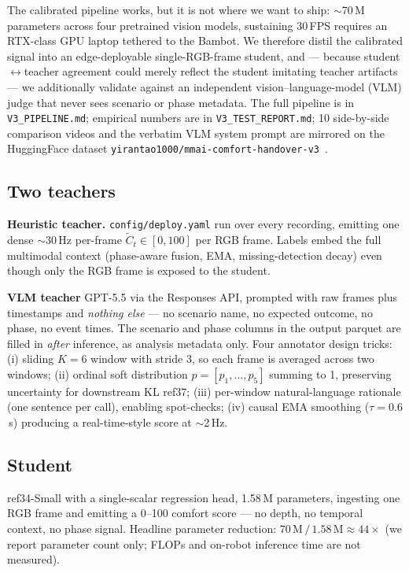 \documentclass{article}
\newcommand{\code}[1]{\texttt{\small #1}}
\begin{document}
The calibrated pipeline works, but it is not where we want to ship: $\sim$70\,M parameters across four pretrained vision models, sustaining 30\,FPS requires an RTX-class GPU laptop tethered to the Bambot. We therefore distil the calibrated signal into an edge-deployable single-RGB-frame student, and --- because student$\leftrightarrow$teacher agreement could merely reflect the student imitating teacher artifacts --- we additionally validate against an independent vision--language-model (VLM) judge that never sees scenario or phase metadata. The full pipeline is in \code{V3\_PIPELINE.md}; empirical numbers are in \code{V3\_TEST\_REPORT.md}; 10 side-by-side comparison videos and the verbatim VLM system prompt are mirrored on the HuggingFace dataset \code{yirantao1000/mmai-comfort-handover-v3}~\cite{ref29}.

\subsection{Two teachers}

\textbf{Heuristic teacher.} \code{config/deploy.yaml} run over every recording, emitting one dense $\sim$30\,Hz per-frame $\tilde{C}_t \in [0, 100]$ per RGB frame. Labels embed the full multimodal context (phase-aware fusion, EMA, missing-detection decay) even though only the RGB frame is exposed to the student.

\textbf{VLM teacher} GPT-5.5 via the Responses API, prompted with raw frames plus timestamps and \emph{nothing else} --- no scenario name, no expected outcome, no phase, no event times. The scenario and phase columns in the output parquet are filled in \emph{after} inference, as analysis metadata only. Four annotator design tricks: (i) sliding $K=6$ window with stride 3, so each frame is averaged across two windows; (ii) ordinal soft distribution $p=[p_1,\dots,p_5]$ summing to 1, preserving uncertainty for downstream KL ref37; (iii) per-window natural-language rationale (one sentence per call), enabling spot-checks; (iv) causal EMA smoothing ($\tau = 0.6$\,s) producing a real-time-style score at $\sim$2\,Hz.

\subsection{Student}

ref34-Small with a single-scalar regression head, 1.58\,M parameters, ingesting one RGB frame and emitting a 0--100 comfort score --- no depth, no temporal context, no phase signal. Headline parameter reduction: $70\,\text{M}\,/\,1.58\,\text{M} \approx 44\times$ (we report parameter count only; FLOPs and on-robot inference time are not measured).
\end{document}
